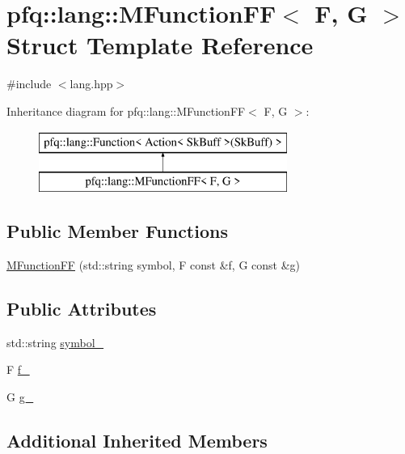 \hypertarget{structpfq_1_1lang_1_1MFunctionFF}{\section{pfq\+:\+:lang\+:\+:M\+Function\+F\+F$<$ F, G $>$ Struct Template Reference}
\label{structpfq_1_1lang_1_1MFunctionFF}
}


{\ttfamily \#include $<$lang.\+hpp$>$}

Inheritance diagram for pfq\+:\+:lang\+:\+:M\+Function\+F\+F$<$ F, G $>$\+:\begin{figure}[H]
\begin{center}
\leavevmode
\includegraphics[height=2.000000cm]{structpfq_1_1lang_1_1MFunctionFF}
\end{center}
\end{figure}
\subsection*{Public Member Functions}
\begin{DoxyCompactItemize}
\item 
\hyperlink{structpfq_1_1lang_1_1MFunctionFF_ad56868cc5edd3213dbf18ec38a2c14e1}{M\+Function\+F\+F} (std\+::string symbol, F const \&f, G const \&g)
\end{DoxyCompactItemize}
\subsection*{Public Attributes}
\begin{DoxyCompactItemize}
\item 
std\+::string \hyperlink{structpfq_1_1lang_1_1MFunctionFF_a091ae27d7c96a42a64a3d042b9915c96}{symbol\+\_\+}
\item 
F \hyperlink{structpfq_1_1lang_1_1MFunctionFF_afe1a6e09912dbc72b448abb8934c2b6b}{f\+\_\+}
\item 
G \hyperlink{structpfq_1_1lang_1_1MFunctionFF_ad95a0298c58403135e705e01ac72523b}{g\+\_\+}
\end{DoxyCompactItemize}
\subsection*{Additional Inherited Members}



